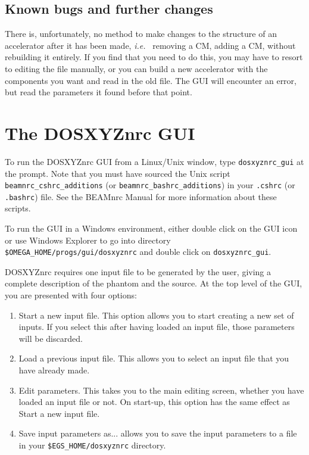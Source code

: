 \documentclass[12pt,twoside]{article}
\newcommand{\ie}{{\em i.e.}}
\begin{document}
\subsection{Known bugs and further changes}

There is, unfortunately, no method to make changes to the structure
of an accelerator after it has been made, \ie~ removing a CM, adding a
CM, without rebuilding it entirely.  If you find that you need to do
this, you may have to resort to editing the file manually, or you can build a new
accelerator with the components you want and read in the old file.  The
GUI will encounter an error, but
read the parameters it found before that point.


\section{The DOSXYZnrc GUI}

To run the DOSXYZnrc GUI from a Linux/Unix window, type {\tt dosxyznrc\_gui}
at the prompt. Note that you must have sourced the Unix script
{\tt beamnrc\_cshrc\_additions} (or {\tt beamnrc\_bashrc\_additions}) in
your {\tt .cshrc} (or {\tt .bashrc}) file.  See the BEAMnrc Manual\cite{Ro04a}
for more information about these scripts.

To run the GUI in a Windows environment, either double click on
the GUI icon or use Windows Explorer to go into directory
{\tt \$OMEGA\_HOME/progs/gui/dosxyznrc} and double click on
{\tt dosxyznrc\_gui}.

DOSXYZnrc requires one input file to be generated by the user, giving a
complete description of the phantom and the source.  At the top level of
the GUI, you are presented with four options:
\begin{enumerate}
\item {\sf Start a new input file}.  This option allows you to start
creating a new set of inputs.  If you select this after having loaded an
input file, those parameters will be discarded.
\item {\sf Load a previous input file}.  This allows you
to select an input file that you have already made.
\item {\sf Edit parameters}.  This takes you to the main editing screen,
whether you
have loaded an input file or not.  On start-up, this option has the same
effect as {\sf Start a new input file}.
\item {\sf Save input parameters as...} allows you to save the input parameters
to a file in your {\tt \$EGS\_HOME/dosxyznrc} directory.

\end{enumerate}
\end{document}
